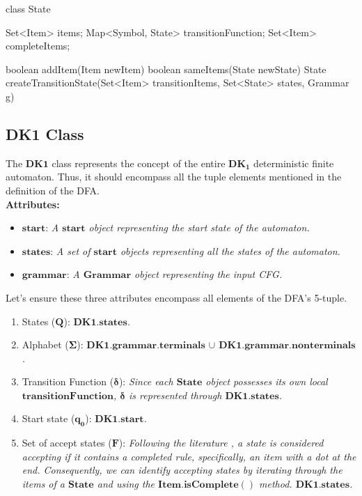 \begin{codeblock}
    class State {
        Set<Item> items;
        Map<Symbol, State> transitionFunction;
        Set<Item> completeItems;

        boolean addItem(Item newItem) {}
        boolean sameItems(State newState) {}
        State createTransitionState(Set<Item> transitionItems, Set<State> states, Grammar g) {}
    }
\end{codeblock}

\vspace{10pt}

\subsection{DK1 Class}

The \(\boldsymbol{DK1}\) class represents the concept of the entire \(\boldsymbol{DK_{1}}\) deterministic finite automaton. Thus, it should encompass all the tuple elements mentioned in the definition of the DFA.\\

\textbf{Attributes:}
\begin{itemize}
    \item \(\boldsymbol{start}\): \textit{A \(\boldsymbol{start}\) object representing the start state of the automaton.}
    \item \(\boldsymbol{states}\): \textit{A set of \(\boldsymbol{start}\) objects representing all the states of the automaton.}
    \item \(\boldsymbol{grammar}\): \textit{A \(\boldsymbol{Grammar}\) object representing the input CFG.}
\end{itemize}

Let's ensure these three attributes encompass all elements of the DFA's 5-tuple.

\begin{enumerate}
    \item States (\(\boldsymbol{Q}\)):  \textit{\(\boldsymbol{DK1.states}\).}
    \item Alphabet (\(\boldsymbol{\Sigma}\)):  \textit{\(\boldsymbol{DK1.grammar.terminals}\) \(\cup\) \(\boldsymbol{DK1.grammar.nonterminals}\).}
    \item Transition Function (\(\boldsymbol{\delta}\)):  \textit{Since each \(\boldsymbol{State}\) object possesses its own local \(\boldsymbol{transitionFunction}\), \(\boldsymbol{\delta}\) is represented through \(\boldsymbol{DK1.states}\).}
    \item Start state (\(\boldsymbol{q_{0}}\)):  \textit{\(\boldsymbol{DK1.start}\).}
    \item Set of accept states (\(\boldsymbol{F}\)):  \textit{Following the literature \cite{sipser}, a state is considered accepting if it contains a completed rule, specifically, an item with a dot at the end. Consequently, we can identify accepting states by iterating through the items of a \(\boldsymbol{State}\) and using the \(\boldsymbol{Item.isComplete()}\) method. \(\boldsymbol{DK1.states}\).}
\end{enumerate}

